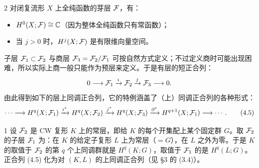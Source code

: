 \begin{example}{2}
对闭复流形 $X$ 上全纯函数的芽层 $\mathcal{F}$，有：
\begin{itemize}
  \item[(i)] $H^0(X;\mathcal{F})\cong\mathbb{C}$（因为整体全纯函数只有常函数）；
  \item[(ii)] 当 $j>0$ 时，$H^j(X;\mathcal{F})$ 是有限维向量空间。
\end{itemize}
\end{example}

子层 $\mathcal{F}_1\subset\mathcal{F}_2$ 与商层 $\mathcal{F}_3=\mathcal{F}_2/\mathcal{F}_1$ 可按自然方式定义；不过定义商时可能出现困难，所以实际上商一般只能作为预层来定义。于是有层的短正合列：
\[
  0\longrightarrow\mathcal{F}_1\xrightarrow{i}\mathcal{F}_2\xrightarrow{j}\mathcal{F}_3\longrightarrow 0 .
\]
由此得到如下的层上同调正合列，它的特例涵盖了（上）同调正合列的各种形式：
\begin{equation}
  \cdots\longrightarrow H^q(X;\mathcal{F}_1)\xrightarrow{i^*}H^q(X;\mathcal{F}_2)\xrightarrow{j^*}H^q(X;\mathcal{F}_3)\xrightarrow{\partial^*}H^{q+1}(X;\mathcal{F}_1)\longrightarrow\cdots . \tag{4.5}
\end{equation}


\begin{example}{1}
设 $\mathcal{F}_2$ 是 CW 复形 $K$ 上的常层，即给 $K$ 的每个开集配上某个固定群 $G$。取 $\mathcal{F}_2$ 的子层 $\mathcal{F}_1$ 为：在 $K$ 的给定子复形 $L$ 上为常层（$=G$），在 $L$ 之外为零。于是 $K$ 的取值于 $\mathcal{F}_2$ 的第 $q$ 个上同调群就是 $H^q(K;G)$，取值于 $\mathcal{F}_1$ 的是 $H^q(L;G)$。正合列 (4.5) 化为对 $(K,L)$ 的上同调正合列（见 §3 的 (3.4)）。
\end{example}

